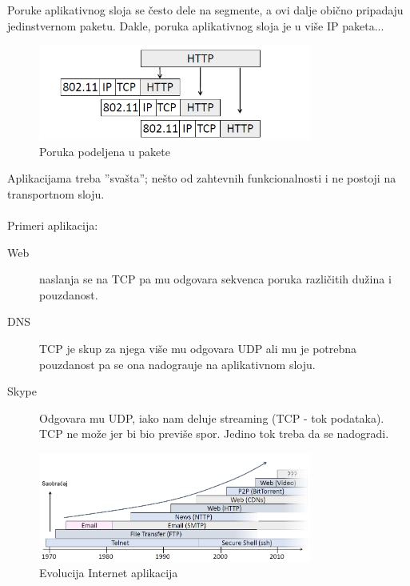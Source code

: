 \documentclass{article} %
\begin{document}
\noindent Poruke aplikativnog sloja se \v cesto dele na segmente, a ovi dalje obi\v cno pripadaju jedinstvernom paketu. Dakle, poruka aplikativnog sloja je u vi\v se IP paketa...

\begin{figure}[H]
	\centering
	\includegraphics[width=0.8\textwidth]{slike-aplikativniSloj/paketi.png}
	\caption{Poruka podeljena u pakete}
\end{figure}

\noindent Aplikacijama treba ''sva\v sta''; ne\v sto od zahtevnih funkcionalnosti i ne postoji na transportnom sloju.
\\
\\ Primeri aplikacija:
\begin{description}
	\item[Web] naslanja se na TCP pa mu odgovara sekvenca poruka razli\v citih du\v zina i pouzdanost.
	\item[DNS] TCP je skup za njega vi\v se mu odgovara UDP ali mu je potrebna pouzdanost pa se ona nadogra\dj uje na aplikativnom sloju.
	\item[Skype] Odgovara mu UDP, iako nam deluje streaming (TCP - tok podataka). TCP ne mo\v ze jer bi bio previ\v se spor. Jedino tok treba da se nadogradi.
\end{description}


\begin{figure}[H]
	\centering
	\includegraphics[width=0.8\textwidth]{slike-aplikativniSloj/evolucija.png}
	\caption{Evolucija Internet aplikacija}
\end{figure}



%
%
\end{document}
